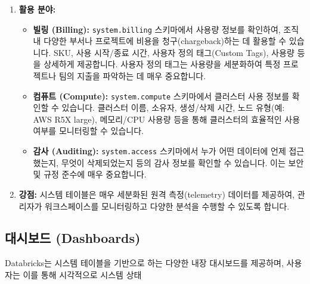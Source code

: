 \documentclass[11pt,a4paper]{article}
\theoremstyle{definition}
\begin{document}
\begin{enumerate}
    \item \textbf{활용 분야:}
    \begin{itemize}
        \item \textbf{빌링 (Billing):} \texttt{system.billing} 스키마에서 사용량 정보를 확인하여, 조직 내 다양한 부서나 프로젝트에 비용을 청구(chargeback)하는 데 활용할 수 있습니다. SKU, 사용 시작/종료 시간, 사용자 정의 태그(Custom Tags), 사용량 등을 상세하게 제공합니다. 사용자 정의 태그는 사용량을 세분화하여 특정 프로젝트나 팀의 지출을 파악하는 데 매우 중요합니다.
        \item \textbf{컴퓨트 (Compute):} \texttt{system.compute} 스키마에서 클러스터 사용 정보를 확인할 수 있습니다. 클러스터 이름, 소유자, 생성/삭제 시간, 노드 유형(예: AWS R5X large), 메모리/CPU 사용량 등을 통해 클러스터의 효율적인 사용 여부를 모니터링할 수 있습니다.
        \item \textbf{감사 (Auditing):} \texttt{system.access} 스키마에서 누가 어떤 데이터에 언제 접근했는지, 무엇이 삭제되었는지 등의 감사 정보를 확인할 수 있습니다. 이는 보안 및 규정 준수에 매우 중요합니다.
    \end{itemize}

    \item \textbf{강점:}
    시스템 테이블은 매우 세분화된 원격 측정(telemetry) 데이터를 제공하여, 관리자가 워크스페이스를 모니터링하고 다양한 분석을 수행할 수 있도록 합니다.
\end{enumerate}

\subsection{대시보드 (Dashboards)}
Databricks는 시스템 테이블을 기반으로 하는 다양한 내장 대시보드를 제공하며, 사용자는 이를 통해 시각적으로 시스템 상태
\end{document}
